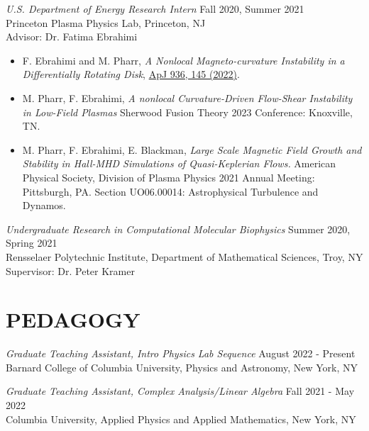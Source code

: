 \documentclass[margin]{rpires}
\begin{document}
\begin{resume}
    \vspace{0.5cm}
    \textit{U.S. Department of Energy Research Intern} \hfill Fall 2020, Summer 2021 \\
    Princeton Plasma Physics Lab, 
    Princeton, NJ\\ 
    Advisor: Dr. Fatima Ebrahimi
    \begin{itemize}  \itemsep -2pt %
    \item {F. Ebrahimi and M. Pharr, \textit{A Nonlocal Magneto-curvature Instability in a Differentially Rotating Disk}, \href{https://dx.doi.org/10.3847/1538-4357/ac892d}{ApJ 936, 145 (2022)}.}
    \vspace{0.5cm}
    \item M. Pharr, F. Ebrahimi, \textit{A nonlocal Curvature-Driven Flow-Shear Instability in Low-Field Plasmas} Sherwood Fusion Theory 2023 Conference: Knoxville, TN.
    \item M. Pharr, F. Ebrahimi, E. Blackman, \textit{Large Scale Magnetic Field Growth and Stability in Hall-MHD Simulations of Quasi-Keplerian Flows.} American Physical Society, Division of Plasma Physics 2021 Annual Meeting: Pittsburgh, PA. Section UO06.00014: Astrophysical Turbulence and Dynamos.
    \end{itemize}

    \vspace{0.5cm}
    \textit{Undergraduate Research in Computational Molecular Biophysics} \hfill Summer 2020, Spring 2021 \\
    Rensselaer Polytechnic Institute, 
    Department of Mathematical Sciences, Troy, NY\\
    Supervisor: Dr. Peter Kramer

\section{PEDAGOGY}
    
    \textit{Graduate Teaching Assistant, Intro Physics Lab Sequence} \hfill August 2022 - Present \\
    Barnard College of Columbia University, Physics and Astronomy, New York, NY

    \textit{Graduate Teaching Assistant, Complex Analysis/Linear Algebra} \hfill Fall 2021 - May 2022 \\
    Columbia University, Applied Physics and Applied Mathematics, New York, NY


\end{resume}
\end{document}
